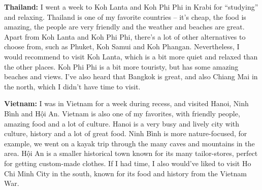 \textbf{Thailand:} I went a week to Koh Lanta and Koh Phi Phi in Krabi for ``studying'' and relaxing. Thailand is one of my favorite countries -- it's cheap, the food is amazing, the people are very friendly and the weather and beaches are great. Apart from Koh Lanta and Koh Phi Phi, there's a lot of other alternatives to choose from, such as Phuket, Koh Samui and Koh Phangan. Nevertheless, I would recommend to visit Koh Lanta, which is a bit more quiet and relaxed than the other places. Koh Phi Phi is a bit more touristy, but has some amazing beaches and views. I've also heard that Bangkok is great, and also Chiang Mai in the north, which I didn't have time to visit.

\textbf{Vietnam:} I was in Vietnam for a week during recess, and visited Hanoi, Ninh Bình and H\d{ô}i An. Vietnam is also one of my favorites, with friendly people, amazing food and a lot of culture. Hanoi is a very busy and lively city with culture, history and a lot of great food. Ninh Bình is more nature-focused, for example, we went on a kayak trip through the many caves and mountains in the area. H\d{ô}i An is a smaller historical town known for its many tailor-stores, perfect for getting custom-made clothes. If I had time, I also would've liked to visit Ho Chi Minh City in the south, known for its food and history from the Vietnam War.

